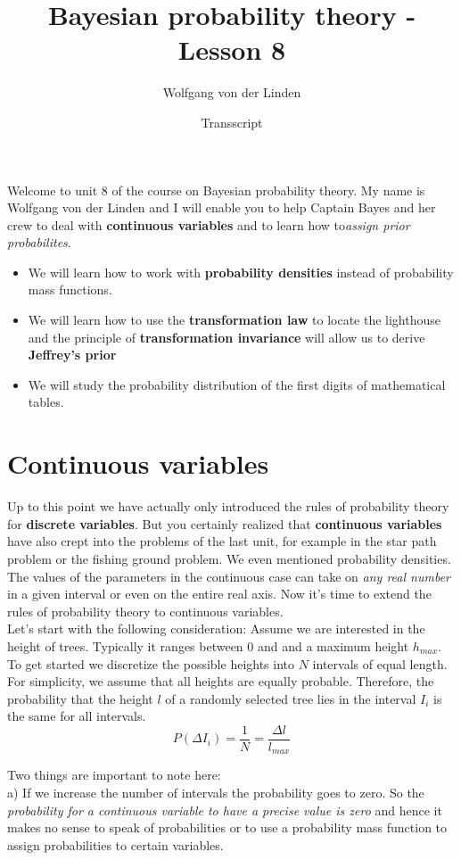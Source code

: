 \documentclass[12pt, a4paper]{scrartcl}
\title{Bayesian probability theory - Lesson 8}
\author{Wolfgang von der Linden}
\date{Transscript}
\begin{document}
\setlength{\parindent}{0pt}
\maketitle
\onehalfspacing

Welcome to unit 8 of the course on Bayesian probability theory. My name
is Wolfgang von der Linden and I will enable you to help Captain Bayes and
her crew to deal with \textbf{continuous variables} and to learn how to\textit{assign prior probabilites}.
\begin{itemize}\item We will learn how to work with \textbf{probability densities} instead of probability mass functions.
\item We will learn how to use the \textbf{transformation law} to locate the lighthouse and the principle of \textbf{transformation invariance} will allow us to derive \textbf{Jeﬀrey’s prior}
\item We will study the probability distribution of the ﬁrst digits of mathematical tables.
\end{itemize}


\section*{Continuous variables}
Up to this point we have actually only introduced the rules of probability
theory for \textbf{discrete variables}. But you certainly realized that \textbf{continuous
variables} have also crept into the problems of the last unit, for example in the star
path problem or the ﬁshing ground problem. We even mentioned probability
densities. \\
The values of the parameters in the continuous case can take on
\textit{any real number} in a given interval or even on the entire real axis.
Now it’s time to extend the rules of probability theory to continuous variables.\\

Let’s start with the following consideration: Assume we are interested in the height of trees. Typically it ranges between 0 and and a maximum height $h_{max}$. To get started we discretize the possible heights into $N$ intervals of equal length. For simplicity, we assume that all heights are equally probable. Therefore,
the probability that the height $l$ of a randomly selected tree lies in
the interval $I_i$ is the same for all intervals.
\[P(\Delta I_i)=\frac 1N = \frac{\Delta l}{l_{max}}\]%

Two things are important to note here:\\
a) If we increase the number of intervals the probability goes to zero. So
the \textit{probability for a continuous variable to have a precise value is zero} and
hence it makes no sense to speak of probabilities or to use a probability mass
function to assign probabilities to certain variables.\\
\end{document}
